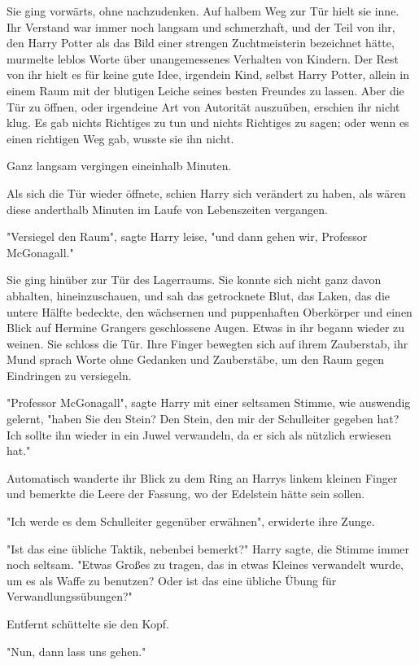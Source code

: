 {Sie ging vorwärts, ohne nachzudenken. Auf halbem Weg zur Tür hielt sie inne. Ihr Verstand war immer noch langsam und schmerzhaft, und der Teil von ihr, den Harry Potter als das Bild einer strengen Zuchtmeisterin bezeichnet hätte, murmelte leblos Worte über unangemessenes Verhalten von Kindern. Der Rest von ihr hielt es für keine gute Idee, irgendein Kind, selbst Harry Potter, allein in einem Raum mit der blutigen Leiche seines besten Freundes zu lassen. Aber die Tür zu öffnen, oder irgendeine Art von Autorität auszuüben, erschien ihr nicht klug. Es gab nichts Richtiges zu tun und nichts Richtiges zu sagen; oder wenn es einen richtigen Weg gab, wusste sie ihn nicht.

Ganz langsam vergingen eineinhalb Minuten.

Als sich die Tür wieder öffnete, schien Harry sich verändert zu haben, als wären diese anderthalb Minuten im Laufe von Lebenszeiten vergangen.

"Versiegel den Raum", sagte Harry leise, "und dann gehen wir, Professor McGonagall."

Sie ging hinüber zur Tür des Lagerraums. Sie konnte sich nicht ganz davon abhalten, hineinzuschauen, und sah das getrocknete Blut, das Laken, das die untere Hälfte bedeckte, den wächsernen und puppenhaften Oberkörper und einen Blick auf Hermine Grangers geschlossene Augen. Etwas in ihr begann wieder zu weinen. Sie schloss die Tür. Ihre Finger bewegten sich auf ihrem Zauberstab, ihr Mund sprach Worte ohne Gedanken und Zauberstäbe, um den Raum gegen Eindringen zu versiegeln.

"Professor McGonagall", sagte Harry mit einer seltsamen Stimme, wie auswendig gelernt, "haben Sie den Stein? Den Stein, den mir der Schulleiter gegeben hat? Ich sollte ihn wieder in ein Juwel verwandeln, da er sich als nützlich erwiesen hat."

Automatisch wanderte ihr Blick zu dem Ring an Harrys linkem kleinen Finger und bemerkte die Leere der Fassung, wo der Edelstein hätte sein sollen.

"Ich werde es dem Schulleiter gegenüber erwähnen", erwiderte ihre Zunge.

"Ist das eine übliche Taktik, nebenbei bemerkt?" Harry sagte, die Stimme immer noch seltsam. "Etwas Großes zu tragen, das in etwas Kleines verwandelt wurde, um es als Waffe zu benutzen? Oder ist das eine übliche Übung für Verwandlungssübungen?"

Entfernt schüttelte sie den Kopf.

"Nun, dann lass uns gehen."

}
